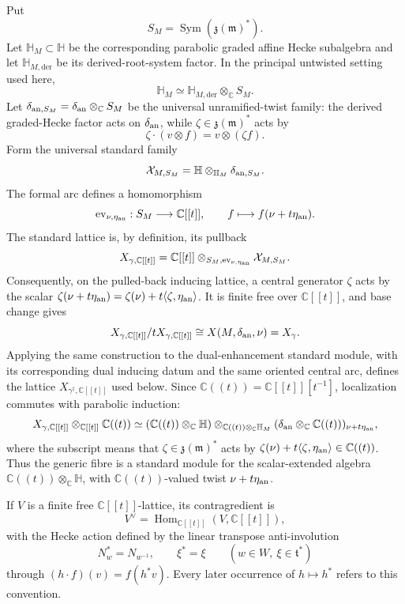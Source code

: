 \documentclass[11pt]{amsart}
\theoremstyle{definition}
\theoremstyle{remark}
\newcommand{\Hh}{\mathbb H}
\newcommand{\C}{\mathbb C}
\newcommand{\A}{\C[[t]]}
\newcommand{\K}{\C((t))}
\begin{document}
Put
\[
 S_M=\operatorname{Sym}(\mathfrak z(\mathfrak m)^*).
\]
Let $\Hh_M\subset\Hh$ be the corresponding parabolic graded affine Hecke
subalgebra and let $\Hh_{M,\mathrm{der}}$ be its derived-root-system factor.
In the principal untwisted setting used here,
\[
 \Hh_M\simeq\Hh_{M,\mathrm{der}}\otimes_{\mathbb C}S_M.
\]
Let
$\delta_{{\rm an},S_M}=\delta_{\rm an}\otimes_{\mathbb C}S_M$
be the universal unramified-twist family: the derived graded-Hecke factor
acts on $\delta_{\rm an}$, while
$\zeta\in\mathfrak z(\mathfrak m)^*$ acts by
\[
 \zeta\cdot(v\otimes f)=v\otimes(\zeta f).
\]
Form the universal standard family
\[
 \mathcal X_{M,S_M}
   =\Hh\otimes_{\Hh_M}\delta_{{\rm an},S_M}.
\]
The formal arc defines a homomorphism
\[
 \operatorname{ev}_{\nu,\eta_{\rm an}}:S_M\longrightarrow\mathbb C[[t]],
 \qquad f\longmapsto f(\nu+t\eta_{\rm an}).
\]
The standard lattice is, by definition, its pullback
\begin{equation}\label{eq:standard-lattice-definition}
 X_{\gamma,\A}
  =\mathbb C[[t]]
    \otimes_{S_M,\operatorname{ev}_{\nu,\eta_{\rm an}}}\mathcal X_{M,S_M}.
\end{equation}
Consequently, on the pulled-back inducing lattice, a central generator
$\zeta$ acts by the scalar
$\zeta(\nu+t\eta_{\rm an})=
\zeta(\nu)+t\langle\zeta,\eta_{\rm an}\rangle$.
It is finite free over $\mathbb C[[t]]$, and base change gives
\[
 X_{\gamma,\A}/tX_{\gamma,\A}\cong X(M,\delta_{\rm an},\nu)=X_\gamma.
\]
Applying the same construction to the dual-enhancement standard module,
with its corresponding dual inducing datum and the same oriented central
arc, defines the lattice $X_{\gamma^\dagger,\A}$ used below.
Since $\K=\A[t^{-1}]$, localization commutes with parabolic induction:
\[
 X_{\gamma,\A}\otimes_{\A}\K
 \simeq
 (\K\otimes_{\mathbb C}\Hh)
 \otimes_{\K\otimes_{\mathbb C}\Hh_M}
 (\delta_{\rm an}\otimes_{\mathbb C}\K)_{\nu+t\eta_{\rm an}},
\]
where the subscript means that $\zeta\in\mathfrak z(\mathfrak m)^*$ acts by
$\zeta(\nu)+t\langle\zeta,\eta_{\rm an}\rangle\in\K$.  Thus the generic fibre is a
standard module for the scalar-extended algebra
$\K\otimes_{\mathbb C}\Hh$, with $\K$-valued twist
$\nu+t\eta_{\rm an}$.

If $V$ is a finite free $\A$-lattice,
its contragredient is
\[
 V^\vee=\operatorname{Hom}_{\A}(V,\A),
\]
with the Hecke action defined by the linear transpose anti-involution
\[
 N_w^*=N_{w^{-1}},\qquad \xi^*=\xi
 \qquad(w\in W,\ \xi\in\mathfrak t^*)
\]
through $(h\cdot f)(v)=f(h^*v)$.  Every later occurrence of $h\mapsto h^*$
refers to this convention.
\end{document}
